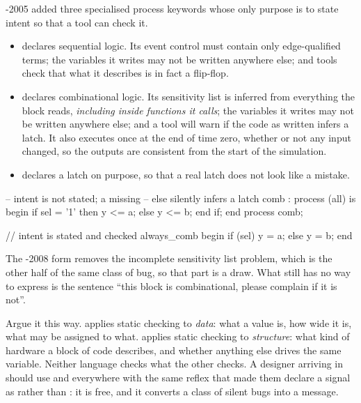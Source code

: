 \SV{}-2005 added three specialised process keywords whose only purpose is to
state intent so that a tool can check it.

\begin{itemize}
\item {} declares sequential logic. Its event control must
  contain only edge-qualified terms; the variables it writes may not be written
  anywhere else; and tools check that what it describes is in fact a
  flip-flop.
\item {} declares combinational logic. Its sensitivity list is
  inferred from everything the block reads, \emph{including inside functions it
  calls}; the variables it writes may not be written anywhere else; and a tool
  will warn if the code as written infers a latch. It also executes once at the
  end of time zero, whether or not any input changed, so the outputs are
  consistent from the start of the simulation.
\item {} declares a latch on purpose, so that a real latch
  does not look like a mistake.
\end{itemize}

\begin{rosetta}
\begin{rleft}
-- intent is not stated; a missing
-- else silently infers a latch
comb : process (all) is
begin
  if sel = '1' then
    y <= a;
  else
    y <= b;
  end if;
end process comb;
\end{rleft}
\begin{rright}
// intent is stated and checked
always_comb begin
  if (sel) y = a;
  else     y = b;
end
\end{rright}
\end{rosetta}

The \VHDL{}-2008  form removes the incomplete sensitivity
list problem, which is the other half of the same class of bug, so that part is
a draw. What \VHDL{} still has no way to express is the sentence ``this block
is combinational, please complain if it is not''.

Argue it this way. \VHDL{} applies static checking to \emph{data}: what a value
is, how wide it is, what may be assigned to what. \SV{} applies static checking
to \emph{structure}: what kind of hardware a block of code describes, and
whether anything else drives the same variable. Neither language checks what
the other checks. A \VHDL{} designer arriving in \SV{} should use
 and  everywhere with the same reflex that
made them declare a signal as  rather than
: it is free, and it converts a class of silent bugs
into a message.

